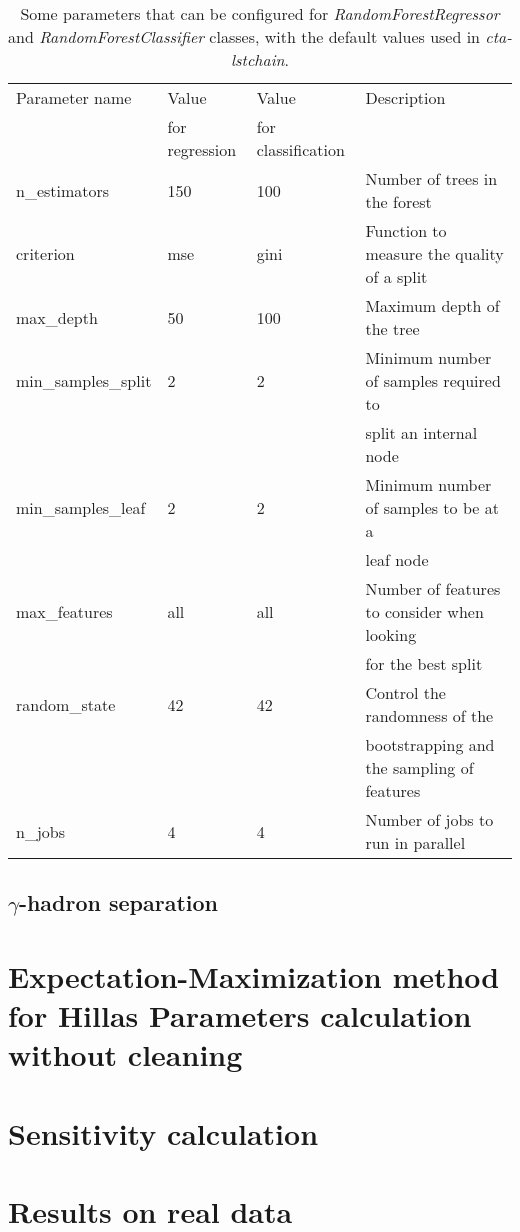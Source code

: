 \documentclass[main.tex]{subfiles}
\begin{document}
\begin{table}
  \centering
  \begin{tabular}{|l|l|l|l|}
    \hline
    Parameter name & Value          & Value              & Description\\
                   & for regression & for classification &  \\ 
    \hline
    n\_estimators       & 150 & 100  & \small{Number of trees in the forest}\\
    criterion           & mse & gini & \small{Function to measure the quality of a split}\\
    max\_depth          & 50  & 100  & \small{Maximum depth of the tree}\\
    min\_samples\_split & 2   & 2    & \small{Minimum number of samples required to}\\
                        &     &      & \small{split an internal node} \\ 
    min\_samples\_leaf  & 2   & 2    & \small{Minimum number of samples to be at a}\\
                        &     &      & \small{leaf node} \\     
    max\_features       & all & all  & \small{Number of features to consider when looking} \\
                        &     &      & \small{for the best split}\\
    random\_state       & 42  & 42   & \small{Control the randomness of the} \\
                        &     &      & \small{bootstrapping and the sampling of features}\\
    n\_jobs             & 4   & 4    & \small{Number of jobs to run in parallel}\\
    \hline
  \end{tabular}
  \caption{Some parameters that can be configured for \textit{RandomForestRegressor} and \textit{RandomForestClassifier} classes, with the default values used in \textit{cta-lstchain}.}
  \label{tab:RFpars}
  \end{table}

\subsection{$\gamma$-hadron separation}

\section[Expectation-Maximization method for Hillas Parameters...]{Expectation-Maximization method for Hillas Parameters calculation without cleaning} \label{sec:EM}
\section{Sensitivity calculation}
\section{Results on real data}
\end{document}
